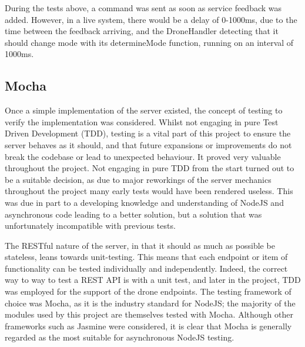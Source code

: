 \documentclass{article}
\begin{document}
During the tests above, a command was sent as soon as service feedback was added. However, in a live system, there would be a delay of 0-1000ms, due to the time between the feedback arriving, and the DroneHandler detecting that it should change mode with its determineMode function, running on an interval of 1000ms. 







\subsection{Mocha}\label{mochaTesting}
Once a simple implementation of the server existed, the concept of testing to verify the implementation was considered. Whilst not engaging in pure Test Driven Development (TDD), testing is a vital part of this project to ensure the server behaves as it should, and that future expansions or improvements do not break the codebase or lead to unexpected behaviour. It proved very valuable throughout the project. Not engaging in pure TDD from the start turned out to be a suitable decision, as due to major reworkings of the server mechanics throughout the project many early tests would have been rendered useless. This was due in part to a developing knowledge and understanding of NodeJS and asynchronous code leading to a better solution, but a solution that was unfortunately incompatible with previous tests. 

The RESTful nature of the server, in that it should as much as possible be stateless, leans towards unit-testing. This means that each endpoint or item of functionality can be tested individually and independently. Indeed, the correct way to way to test a REST API is with a unit test\cite{mardan2014tdd}, and later in the project, TDD was employed for the support of the drone endpoints. The testing framework of choice was Mocha, as it is the industry standard for NodeJS; the majority of the modules used by this project are themselves tested with Mocha. Although other frameworks such as Jasmine\cite{jasmine} were considered, it is clear that Mocha is generally regarded as the most suitable for asynchronous NodeJS testing\cite{testingReview}. 
\end{document}
